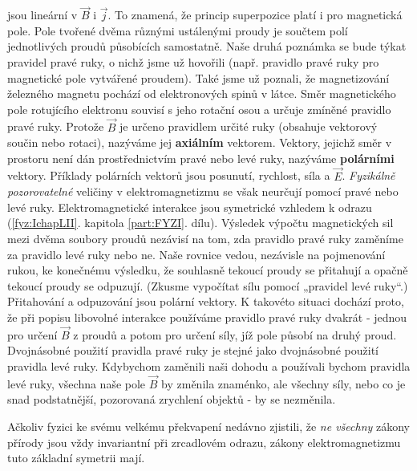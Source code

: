     jsou lineární v \(\vec{B}\) i \(\vec{j}\). To znamená, že princip superpozice platí i pro
    magnetická pole. Pole tvořené dvěma různými ustálenými proudy je součtem polí jednotlivých
    proudů působících samostatně. Naše druhá poznámka se bude týkat pravidel pravé ruky, o nichž
    jsme už hovořili (např. pravidlo pravé ruky pro magnetické pole vytvářené proudem). Také jsme už
    poznali, že magnetizování železného magnetu pochází od elektronových spinů v látce. Směr
    magnetického pole rotujícího elektronu souvisí s jeho rotační osou a určuje zmíněné pravidlo
    pravé ruky. Protože \(\vec{B}\) je určeno pravidlem určité ruky (obsahuje vektorový součin nebo
    rotaci), nazýváme jej \textbf{axiálním} vektorem. Vektory, jejichž směr v prostoru není dán
    prostřednictvím pravé nebo levé ruky, nazýváme \textbf{polárními} vektory. Příklady polárních
    vektorů jsou posunutí, rychlost, síla a \(\vec{E}\). \emph{Fyzikálně pozorovatelné} veličiny v
    elektromagnetizmu se však neurčují pomocí pravé nebo levé ruky. Elektromagnetické interakce jsou
    symetrické vzhledem k odrazu (\ref{fyz:IchapLII}. kapitola \ref{part:FYZI}. dílu). Výsledek
    výpočtu magnetických sil mezi dvěma soubory proudů nezávisí na tom, zda pravidlo pravé ruky
    zaměníme za pravidlo levé ruky nebo ne. Naše rovnice vedou, nezávisle na pojmenování rukou, ke
    konečnému výsledku, že souhlasně tekoucí proudy se přitahují a opačně tekoucí proudy se
    odpuzují. (Zkusme vypočítat sílu pomocí „pravidel levé ruky“.) Přitahování a odpuzování jsou
    polární vektory. K takovéto situaci dochází proto, že při popisu libovolné interakce používáme
    pravidlo pravé ruky dvakrát - jednou pro určení \(\vec{B}\) z proudů a potom pro určení síly,
    jíž pole působí na druhý proud. Dvojnásobné použití pravidla pravé ruky je stejné jako
    dvojnásobné použití pravidla levé ruky. Kdybychom zaměnili naši dohodu a používali bychom
    pravidla levé ruky, všechna naše pole \(\vec{B}\) by změnila znaménko, ale všechny síly, nebo co
    je snad podstatnější, pozorovaná zrychlení objektů - by se nezměnila.
    
    Ačkoliv fyzici ke svému velkému překvapení nedávno zjistili, že \emph{ne všechny} zákony přírody
    jsou vždy invariantní při zrcadlovém odrazu, zákony elektromagnetizmu tuto základní symetrii
    mají.
        








